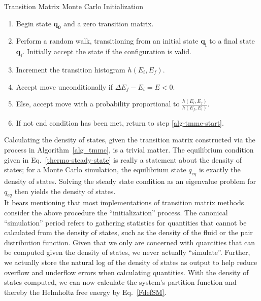 \documentclass[12pt]{article}
\begin{document}
\begin{algorithm}[tb]
    \caption{Transition Matrix Monte Carlo Initialization}
    \label{alg_tmmc}
    \hrulefill
    \begin{enumerate}
        \item Begin state $\mathbf{q_0}$ and a zero transition matrix.
        \item Perform a random walk, transitioning from an initial state $\mathbf{q_i}$ to a final state $\mathbf{q_{f}}$. Initially accept the state if the configuration is valid. \label{alg-tmmc-start}
        \item Increment the transition histogram $h(E_i, E_f)$.
        \item Accept move unconditionally if $\Delta E_f - E_i = E < 0$.
        \item Else, accept move with a probability proportional to $\frac{h(E_i, E_f )}{h(E_f, E_i)}$.
        \item If not end condition has been met, return to step \ref{alg-tmmc-start}.   
    \end{enumerate}
    \hrulefill
\end{algorithm}

Calculating the density of states, given the transition matrix constructed via the process in Algorithm~\ref{alg_tmmc}, is a trivial matter. The equilibrium condition given in Eq.~\ref{thermo-steady-state} is really a statement about the density of states; for a Monte Carlo simulation, the equilibrium state $q_{eq}$ is exactly the density of states. Solving the steady state condition as an eigenvalue problem for $q_{eq}$ then yields the density of states\cite{perlinthesis}. \\

It bears mentioning that most implementations of transition matrix methods consider the above procedure the ``initialization'' process. The canonical ``simulation'' period refers to gathering statistics for quantities that cannot be calculated from the density of states, such as the density of the fluid or the pair distribution function. Given that we only are concerned with quantities that can be computed given the density of states, we never actually ``simulate''. Further, we actually store the natural log of the density of states as output to help reduce overflow and underflow errors when calculating quantities. With the density of states computed, we can now calculate the system's partition function and thereby the Helmholtz free energy by Eq.~\ref{FdefSM}.
\end{document}
